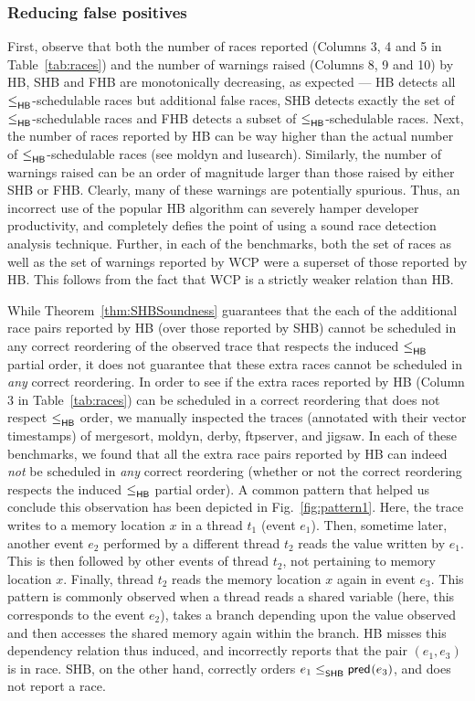 \subsubsection{Reducing false positives}
First, observe that both the number of races reported (Columns 3, 4
and 5 in Table~\ref{tab:races}) and the number of warnings raised
(Columns 8, 9 and 10) by HB, SHB and FHB are monotonically decreasing,
as expected --- HB detects all $\leq^{}_{\mathsf{HB}}$-schedulable races but
additional false races, SHB detects exactly the set of
$\leq^{}_{\mathsf{HB}}$-schedulable races and FHB detects a subset of
$\leq^{}_{\mathsf{HB}}$-schedulable races.  Next, the number of races reported by HB
can be way higher than the actual number of $\leq^{}_{\mathsf{HB}}$-schedulable races
(see \textsf{moldyn} and \textsf{lusearch}).  Similarly, the number of
warnings raised can be an order of magnitude larger than those raised
by either SHB or FHB.  Clearly, many of these warnings are potentially
spurious.  Thus, an incorrect use of the popular HB algorithm can
severely hamper developer productivity, and completely defies the
point of using a sound race detection analysis technique.
Further, in each of the benchmarks, both the set of races as well 
as the set of warnings
reported by WCP were a superset of those reported by HB. 
This follows from the fact that WCP is a strictly weaker relation than HB.



While Theorem~\ref{thm:SHBSoundness} guarantees that the each of the additional
race pairs reported by HB (over those reported by SHB) 
cannot be scheduled in any correct reordering of the observed trace 
that respects the induced $\leq^{}_{\mathsf{HB}}$ partial order, it does not guarantee
that these extra races cannot be scheduled in \emph{any} correct reordering.
In order to see if the extra races reported by HB (Column 3 in Table~\ref{tab:races})
can be scheduled in a correct reordering that does not respect $\leq^{}_{\mathsf{HB}}$ order,
we manually inspected the traces (annotated with their
vector timestamps) of \textsf{mergesort}, \textsf{moldyn}, \textsf{derby}, 
\textsf{ftpserver}, and \textsf{jigsaw}. In each of these benchmarks,
we found that all the extra race pairs reported by HB can indeed
\emph{not} be scheduled in \emph{any} correct reordering
(whether or not the correct reordering respects the induced $\leq^{}_{\mathsf{HB}}$ partial order).
A common pattern that helped us conclude this observation has been depicted in
Fig.~\ref{fig:pattern1}.  Here, the trace writes to a memory location
$x$ in a thread $t_1$ (event $e_1$).  Then, sometime later, another
event $e_2$ performed by a different thread $t_2$ reads the value
written by $e_1$. This is then followed by other events of thread
$t_2$, not pertaining to memory location $x$.  Finally, thread $t_2$
reads the memory location $x$ again in event $e_3$.  This pattern is
commonly observed when a thread reads a shared variable (here, this
corresponds to the event $e_2$), takes a branch depending upon the
value observed and then accesses the shared memory again within the
branch.  HB misses this dependency relation thus induced, and
incorrectly reports that the pair $(e_1, e_3)$ is in race.  SHB, on
the other hand, correctly orders $e_1 \leq^{}_{\mathsf{SHB}} \mathsf{pred}_{}(e_3)$, and does not
report a race.

